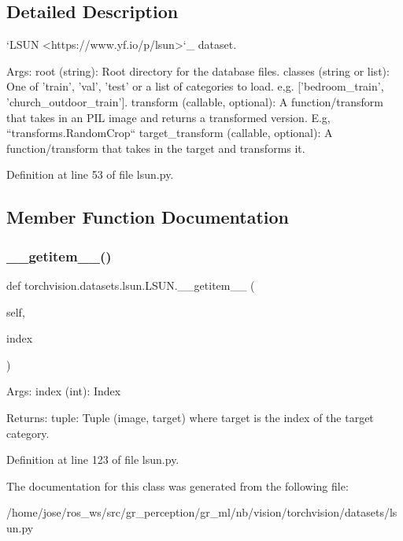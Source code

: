 \subsection{Detailed Description}
\begin{DoxyVerb}`LSUN <https://www.yf.io/p/lsun>`_ dataset.

Args:
    root (string): Root directory for the database files.
    classes (string or list): One of {'train', 'val', 'test'} or a list of
        categories to load. e,g. ['bedroom_train', 'church_outdoor_train'].
    transform (callable, optional): A function/transform that  takes in an PIL image
        and returns a transformed version. E.g, ``transforms.RandomCrop``
    target_transform (callable, optional): A function/transform that takes in the
        target and transforms it.
\end{DoxyVerb}
 

Definition at line 53 of file lsun.\+py.



\subsection{Member Function Documentation}
\mbox{\label{classtorchvision_1_1datasets_1_1lsun_1_1LSUN_ad5ec0ffa137d42ef387cc86809e581ba}} 
\subsubsection{\texorpdfstring{\+\_\+\+\_\+getitem\+\_\+\+\_\+()}{\_\_getitem\_\_()}}
{\footnotesize\ttfamily def torchvision.\+datasets.\+lsun.\+L\+S\+U\+N.\+\_\+\+\_\+getitem\+\_\+\+\_\+ (\begin{DoxyParamCaption}\item[{}]{self,  }\item[{}]{index }\end{DoxyParamCaption})}

\begin{DoxyVerb}Args:
    index (int): Index

Returns:
    tuple: Tuple (image, target) where target is the index of the target category.
\end{DoxyVerb}
 

Definition at line 123 of file lsun.\+py.



The documentation for this class was generated from the following file\+:\begin{DoxyCompactItemize}
\item 
/home/jose/ros\+\_\+ws/src/gr\+\_\+perception/gr\+\_\+ml/nb/vision/torchvision/datasets/lsun.\+py\end{DoxyCompactItemize}
